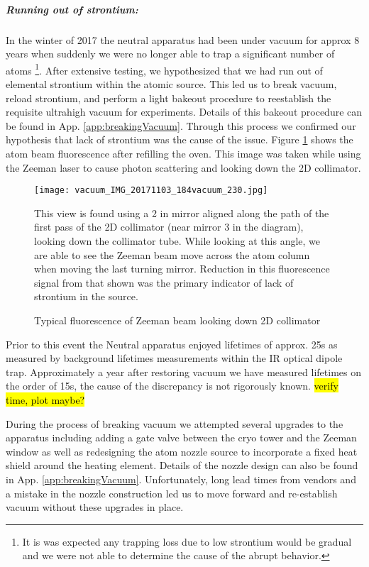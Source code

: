 \subparagraph{Running out of strontium:}
In the winter of 2017 the neutral apparatus had been under vacuum for approx 8 years when suddenly we were no longer able to trap a significant number of atoms \footnote{It is was expected any trapping loss due to low strontium would be gradual and we were not able to determine the cause of the abrupt behavior.}.
After extensive testing, we hypothesized that we had run out of elemental strontium within the atomic source.
This led us to break vacuum, reload strontium, and perform a light bakeout procedure to reestablish the requisite ultrahigh vacuum for experiments.
Details of this bakeout procedure can be found in App. \ref{app:breakingVacuum}. 
Through this process we confirmed our hypothesis that lack of strontium was the cause of the issue. 
Figure \ref{fig:2d_coll_flourescence} shows the atom beam fluorescence after refilling the oven.
This image was taken while using the Zeeman laser to cause photon scattering and looking down the 2D collimator.
	\begin{figure}
		\centerline{
		\texttt{[image: vacuum\_IMG\_20171103\_184vacuum\_230.jpg]}}
		\caption{Typical fluorescence of Zeeman beam looking down 2D collimator}{This view is found using a 2 in mirror aligned along the path of the first pass of the 2D collimator (near mirror 3 in the diagram), looking down the collimator tube. While looking at this angle, we are able to see the Zeeman beam move across the atom column when moving the last turning mirror. Reduction in this fluorescence signal from that shown was the primary indicator of lack of strontium in the source.}
		\label{fig:2d_coll_flourescence}
	\end{figure}  
Prior to this event the Neutral apparatus enjoyed lifetimes of approx. 25s as measured by background lifetimes measurements within the IR optical dipole trap. 
Approximately a year after restoring vacuum we have measured lifetimes on the order of 15s, the cause of the discrepancy is not rigorously known. \hl{verify time, plot maybe?}

During the process of breaking vacuum we attempted several upgrades to the apparatus including adding a gate valve between the cryo tower and the Zeeman window as well as redesigning the atom nozzle source to incorporate a fixed heat shield around the heating element. 
Details of the nozzle design can also be found in App. \ref{app:breakingVacuum}.
Unfortunately, long lead times from vendors and a mistake in the nozzle construction led us to move forward and re-establish vacuum without these upgrades in place.


